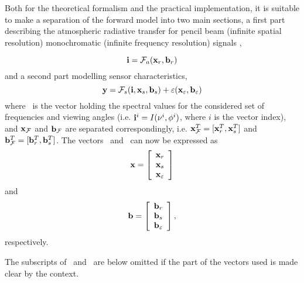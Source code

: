  Both for the theoretical formalism and the practical implementation,
 it is suitable to make a separation of the forward model into two
 main sections, a first part describing the atmospheric radiative
 transfer for pencil beam (infinite spatial resolution) monochromatic
 (infinite frequency resolution) signals \citep{eriksson:99},

 \begin{equation}
   \mathbf{i} = \mathcal{F}_a(\mathbf{x}_r,\mathbf{b}_r)
  \label{eq:formalism:fma}
 \end{equation}
 and a second part modelling sensor characteristics,
 \begin{equation}
   \mathbf{y} = \mathcal{F}_s(\mathbf{i},\mathbf{x}_s,\mathbf{b}_s) + \varepsilon(\mathbf{x}_{\varepsilon},\mathbf{b}_{\varepsilon})
  \label{eq:formalism:fms}
 \end{equation}
 where \iv\ is the vector holding the spectral values for the
 considered set of frequencies and viewing angles (i.e.
 $\mathbf{i}^i=I(\nu^i,\phi^i)$, where $i$ is the vector index), and
 $\mathbf{x}_{\mathcal{F}}$ and $\mathbf{b}_{\mathcal{F}}$ are separated correspondingly, i.e.
 $\mathbf{x}_{\mathcal{F}}^T= [\mathbf{x}_r^T,\mathbf{x}_s^T]$ and $\mathbf{b}_{\mathcal{F}}^T= [\mathbf{b}_r^T,\mathbf{b}_s^T]$. The
 vectors \xt\ and \bt\ can now be expressed as
 \begin{equation}
   \mathbf{x} = \left[ \begin{array}{c} \mathbf{x}_r\\ \mathbf{x}_s \\ \mathbf{x}_{\varepsilon} \end{array} \right]
 \end{equation}
 and
 \begin{equation}
   \mathbf{b} = \left[ \begin{array}{c} \mathbf{b}_r\\ \mathbf{b}_s \\ \mathbf{b}_{\varepsilon} \end{array}\right],
 \end{equation}
 respectively.

 The subscripts of \xt\ and \bt\ are below omitted if the part of the
 vectors used is made clear by the context. 



 \label{sec:formalism:sensor}
  
